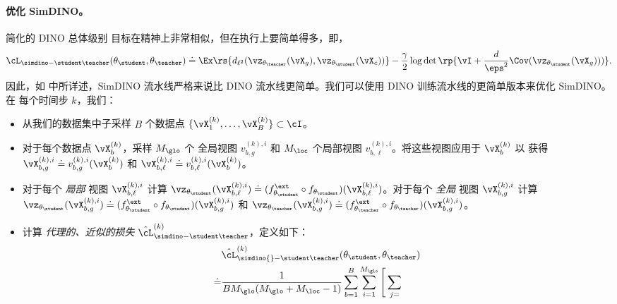 \documentclass[../../book-main_zh.tex]{subfiles}
\begin{document}
\paragraph{优化 SimDINO。} 简化的 DINO 总体级别
目标在精神上非常相似，但在执行上要简单得多，即，
\begin{equation}\label{eq:simdino_loss_teacherstudent}
    \cL_{\simdino-\student\teacher}(\theta_{\student}, \theta_{\teacher}) \doteq
    \Ex\rs{d_{\ell^{2}}(\vz_{\theta_{\teacher}}(\vX_{g}),
    \vz_{\theta_{\student}}(\vX_{c}))} - \frac{\gamma}{2}\log\det\rp{\vI
+ \frac{d}{\eps^{2}}\Cov(\vz_{\theta_{\student}}(\vX_{g})))}.
\end{equation}
因此，如  中所详述，SimDINO
流水线严格来说比 DINO 流水线更简单。我们可以使用
DINO 训练流水线的更简单版本来优化 SimDINO。在
每个时间步 \(k\)，我们：
\begin{itemize}
\item 从我们的数据集中子采样 \(B\) 个数据点 \(\{\vX_{1}^{(k)},
    \dots, \vX_{B}^{(k)}\} \subset \cI\)。
\item 对于每个数据点 \(\vX_{b}^{(k)}\)，采样 \(M_{\glo}\) 个
    全局视图 \(v_{b, g}^{(k), i}\) 和 \(M_{\loc}\) 个局部视图
    \(v_{b, \ell}^{(k), i}\)。将这些视图应用于 \(\vX_{b}^{(k)}\) 以
    获得 \(\vX_{b, g}^{(k), i} \doteq v_{b, g}^{(k),
    i}(\vX_{b}^{(k)})\) 和 \(\vX_{b, \ell}^{(k), i} \doteq v_{b,
    \ell}^{(k), i}(\vX_{b}^{(k)})\)。
\item 对于每个 \textit{局部} 视图 \(\vX_{b, \ell}^{(k), i}\) 计算
    \(\vz_{\theta_{\student}}(\vX_{b, \ell}^{(k), i}) \doteq
        (f_{\theta_{\student}}^{\ext} \circ
    f_{\theta_{\student}})(\vX_{b, \ell}^{(k), i})\)。对于每个
    \textit{全局} 视图 \(\vX_{b, g}^{(k), i}\) 计算
    \(\vz_{\theta_{\student}}(\vX_{b, g}^{(k), i}) \doteq
        (f_{\theta_{\student}}^{\ext} \circ
    f_{\theta_{\student}})(\vX_{b, g}^{(k), i})\) 和
    \(\vz_{\theta_{\teacher}}(\vX_{b, g}^{(k), i}) \doteq
        (f_{\theta_{\teacher}}^{\ext} \circ
    f_{\theta_{\teacher}})(\vX_{b, g}^{(k), i})\)。
\item 计算 \textit{代理的、近似的损失}
    \(\hat{\cL}_{\simdino-\student\teacher}^{(k)}\)，定义如下：
    \begin{align}\label{eq:simdino_loss_teacherstudent_empirical}
        &\hat{\cL}_{\simdino{}-\student\teacher}^{(k)}(\theta_{\student},
        \theta_{\teacher}) \nonumber \\
        \doteq &
        \frac{1}{BM_{\glo}(M_{\glo} + M_{\loc} - 1)}\sum_{b =
        1}^{B}\sum_{i = 1}^{M_{\glo}}\Bigg[\sum_{j =
}
\end{align}
\end{itemize}
\end{document}
